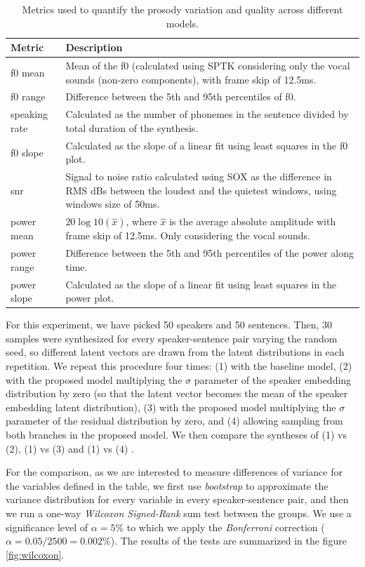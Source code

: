 \begin{table}
	\footnotesize
		\centering
	\caption{Metrics used to quantify the prosody variation and quality across different models.}
	\begin{tabular}{p{}|p{}}
		\toprule
		Metric & Description \\
		\midrule
		f0 mean &  Mean of the f0 (calculated using SPTK \cite{sptk} considering only the vocal sounds (non-zero components), with frame skip of 12.5ms.\\
		f0 range & Difference between the 5th and 95th percentiles of f0. \\
		speaking rate & Calculated as the number of phonemes in the sentence divided by total duration of the synthesis. \\
		f0 slope & Calculated as the slope of a linear fit using least squares in the f0 plot. \\
		snr & Signal to noise ratio calculated using SOX \cite{SOX} as the difference in RMS dBs between the loudest and the quietest windows, using windows size of 50ms. \\
		power mean & $20\log10(\hat{x})$, where $\hat{x}$ is the average absolute amplitude with frame skip of 12.5ms. Only considering the vocal sounds. \\
		power range & Difference between the 5th and 95th percentiles of the power along time. \\
		power slope & Calculated as the slope of a linear fit using least squares in the power plot. \\
		\bottomrule
	\end{tabular}
	\label{tab:metrics}
\end{table}

For this experiment, we have picked 50 speakers and 50 sentences. Then, 30 samples were synthesized for every speaker-sentence pair varying the random seed, so different latent vectors are drawn from the latent distributions in each repetition. We repeat this procedure four times: (1) with the baseline model, (2) with the proposed model multiplying the $\sigma$ parameter of the speaker embedding distribution by zero (so that the latent vector becomes the mean of the speaker embedding latent distribution), (3) with the proposed model multiplying the $\sigma$ parameter of the residual distribution by zero, and (4) allowing sampling from both branches in the proposed model. We then compare the syntheses of (1) vs (2), (1) vs (3) and (1) vs (4) .

For the comparison, as we are interested to measure differences of variance for the variables defined in the table, we first use \textit{bootstrap} to approximate the variance distribution for every variable in every speaker-sentence pair, and then we run a one-way \textit{Wilcoxon Signed-Rank} sum test between the groups. We use a significance level of $\alpha=5\%$ to which we apply the \textit{Bonferroni} correction ($\alpha=0.05/2500=0.002\%$). The results of the tests are summarized in the figure \ref{fig:wilcoxon}.

